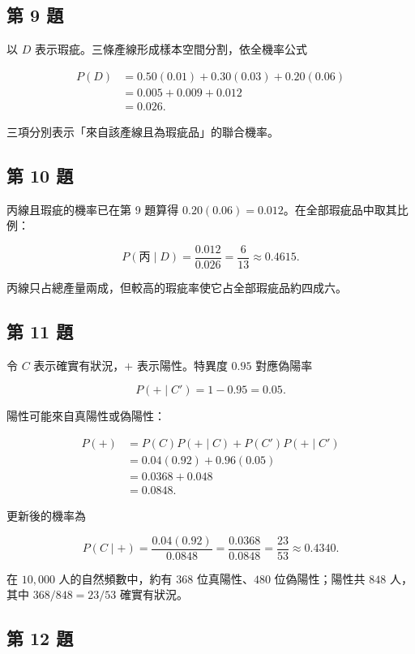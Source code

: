 \documentclass[11pt,a4paper]{article}
\begin{document}
\subsection{第 9 題}\label{ux7b2c-9-ux984c}

以 \(D\) 表示瑕疵。三條產線形成樣本空間分割，依全機率公式

\[
\begin{aligned}
P(D)
&=0.50(0.01)+0.30(0.03)+0.20(0.06)\\
&=0.005+0.009+0.012\\
&=\boxed{0.026}.
\end{aligned}
\]

三項分別表示「來自該產線且為瑕疵品」的聯合機率。

\subsection{第 10 題}\label{ux7b2c-10-ux984c}

丙線且瑕疵的機率已在第 9 題算得 \(0.20(0.06)=0.012\)。在全部瑕疵品中取其比例：

\[
P(\text{丙}\mid D)
=\frac{0.012}{0.026}
=\boxed{\frac6{13}\approx0.4615}.
\]

丙線只占總產量兩成，但較高的瑕疵率使它占全部瑕疵品約四成六。

\subsection{第 11 題}\label{ux7b2c-11-ux984c}

令 \(C\) 表示確實有狀況，\(+\) 表示陽性。特異度 \(0.95\) 對應偽陽率

\[
P(+\mid C')=1-0.95=0.05.
\]

陽性可能來自真陽性或偽陽性：

\[
\begin{aligned}
P(+)
&=P(C)P(+\mid C)+P(C')P(+\mid C')\\
&=0.04(0.92)+0.96(0.05)\\
&=0.0368+0.048\\
&=\boxed{0.0848}.
\end{aligned}
\]

更新後的機率為

\[
P(C\mid +)
=\frac{0.04(0.92)}{0.0848}
=\frac{0.0368}{0.0848}
=\boxed{\frac{23}{53}\approx0.4340}.
\]

在 \(10{,}000\) 人的自然頻數中，約有 \(368\) 位真陽性、\(480\) 位偽陽性；陽性共 \(848\) 人，其中 \(368/848=23/53\) 確實有狀況。

\subsection{第 12 題}\label{ux7b2c-12-ux984c}
\end{document}
